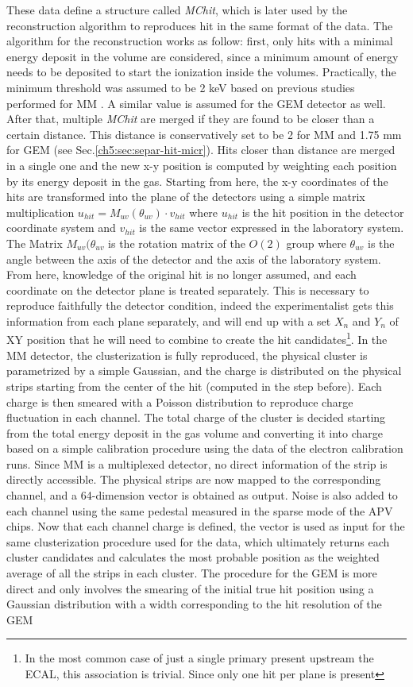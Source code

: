 These data define a structure called \textit{MChit}, which is later used by the reconstruction algorithm to reproduces hit in the same format of the data. The algorithm for the reconstruction works as follow: first, only hits with a minimal energy deposit in the volume are considered, since a minimum amount of energy needs to be deposited to start the ionization inside the volumes. Practically, the minimum threshold was assumed to be 2 keV based on previous studies performed for MM \cite{IGUAZ20121079}. A similar value is assumed for the GEM detector as well. After that, multiple \textit{MChit} are merged if they are found to be closer than a certain distance. This distance is conservatively set to be 2 \mmi for MM and 1.75 mm \mmi for GEM (see Sec.\ref{ch5:sec:separ-hit-micr}). Hits closer than distance are merged in a single one and the new x-y position is computed by weighting each position by its energy deposit in the gas. Starting from here, the x-y coordinates of the hits are transformed into the plane of the detectors using a simple matrix multiplication $u_{hit} = M_{uv}(\theta_{uv}) \cdot v_{hit}$ where $u_{hit}$ is the hit position in the detector coordinate system and $v_{hit}$ is the same vector expressed in the laboratory system. The Matrix $M_{uv}(\theta_{uv}$ is the rotation matrix of the $O(2)$ group where $\theta_{uv}$ is the angle between the axis of the detector and the axis of the laboratory system. From here, knowledge of the original hit is no longer assumed, and each coordinate on the detector plane is treated separately. This is necessary to reproduce faithfully the detector condition, indeed the experimentalist gets this information from each plane separately, and will end up with a set $X_n$ and $Y_n$ of XY position that he will need to combine to create the hit candidates\footnote{In the most common case of just a single primary present upstream the ECAL, this association is trivial. Since only one hit per plane is present}. In the MM detector, the clusterization is fully reproduced, the physical cluster is parametrized by a simple Gaussian, and the charge is distributed on the physical strips starting from the center of the hit (computed in the step before). Each charge is then smeared with a Poisson distribution to reproduce charge fluctuation in each channel. The total charge of the cluster is decided starting from the total energy deposit in the gas volume and converting it into charge based on a simple calibration procedure using the data of the electron calibration runs. Since MM is a multiplexed detector, no direct information of the strip is directly accessible. The physical strips are now mapped to the corresponding channel, and a 64-dimension vector is obtained as output. Noise is also added to each channel using the same pedestal measured in the sparse mode of the APV chips. Now that each channel charge is defined, the vector is used as input for the same clusterization procedure used for the data, which ultimately returns each cluster candidates and calculates the most probable position as the weighted average of all the strips in each cluster. The procedure for the GEM is more direct and only involves the smearing of the initial true hit position using a Gaussian distribution with a width corresponding to the hit resolution of the GEM 